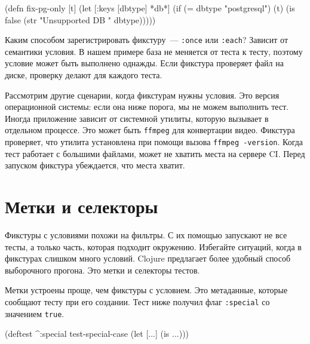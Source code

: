 \else

\begin{english}
  \begin{clojure}
(defn fix-pg-only [t]
  (let [{:keys [dbtype]} *db*]
    (if (= dbtype "postgresql")
      (t)
      (is false (str "Unsupported DB " dbtype)))))
  \end{clojure}
\end{english}

\fi

Каким способом зарегистрировать фикстуру~--- \verb|:once| или \verb|:each|?
Зависит от семантики условия. В нашем примере база не меняется от теста к тесту,
поэтому условие может быть выполнено однажды. Если фикстура проверяет файл на
диске, проверку делают для каждого теста.

Рассмотрим другие сценарии, когда фикстурам нужны условия. Это версия
операционной системы: если она ниже порога, мы не можем выполнить тест. Иногда
приложение зависит от системной утилиты, которую вызывает в отдельном
процессе. Это может быть \verb|ffmpeg| для конвертации видео. Фикстура
проверяет, что утилита установлена при помощи вызова \verb|ffmpeg -version|.
Когда тест работает с большими файлами, может не хватить места на сервере
CI. Перед запуском фикстура убеждается, что места хватит.

\section{Метки и селекторы}


Фикстуры с условиями похожи на фильтры. С их помощью запускают не все тесты, а
только часть, которая подходит окружению. Избегайте ситуаций, когда в фикстурах
слишком много условий. Clojure предлагает более удобный способ выборочного
прогона. Это метки и селекторы тестов.

Метки устроены проще, чем фикстуры с условием. Это метаданные, которые сообщают
тесту при его создании. Тест ниже получил флаг \verb|:special| со значением
\verb|true|.

\begin{english}
  \begin{clojure}
(deftest ^:special test-special-case
  (let [...]
    (is ...)))
  \end{clojure}
\end{english}



